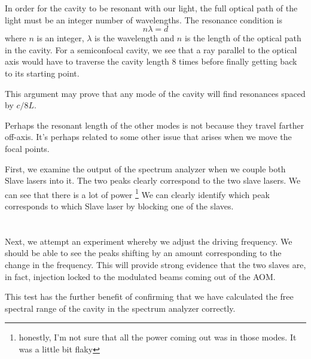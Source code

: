 In order for the cavity to be resonant with our light, the full optical path of the light must be an integer number of wavelengths. The resonance condition is 
\begin{equation}
n \lambda = d
\end{equation}
where $n$ is an integer, $\lambda$ is the wavelength and $n$ is the length of the optical path in the cavity. 
For a semiconfocal cavity, we see that a ray parallel to the optical axis would have to traverse the cavity length 8 times before finally getting back to its starting point. 

This argument may prove that any mode of the cavity will find resonances spaced by $c/8L$.




Perhaps the resonant length of the other modes is not because they travel farther off-axis. It's perhaps related to some other issue that arises when we move the focal points.




First, we examine the output of the spectrum analyzer when we couple both Slave lasers into it. 
The two peaks clearly correspond to the two slave lasers. We can see that there is a lot of power \footnote{honestly, I'm not sure that all the power coming out was in those modes. It was a little bit flaky}
We can clearly identify which peak corresponds to which Slave laser by blocking one of the slaves. 

\section{}

Next, we attempt an experiment whereby we adjust the driving frequency. We should be able to see the peaks shifting by an amount corresponding to the change in the frequency. This will provide strong evidence that the two slaves are, in fact, injection locked to the modulated beams coming out of the AOM. 

This test has the further benefit of confirming that we have calculated the free spectral range of the cavity in the spectrum analyzer correctly. 


